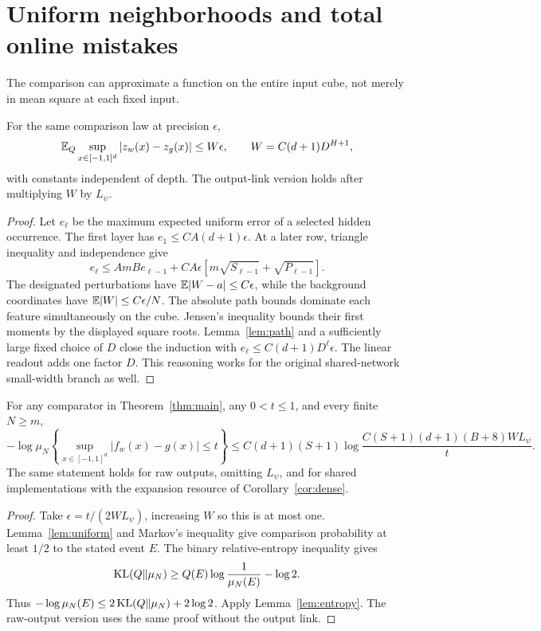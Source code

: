 \section{Uniform neighborhoods and total online mistakes}
The comparison can approximate a function on the entire input cube, not merely in mean square at each fixed input.

\begin{lemma}\label{lem:uniform}
For the same comparison law at precision $\epsilon$,
\[
 \mathbb E_Q\sup_{x\in[-1,1]^d}|z_w(x)-z_g(x)|
 \le W\epsilon,\qquad W=C(d+1)D^{H+1},
\]
with constants independent of depth. The output-link version holds after multiplying $W$ by $L_\psi$.
\end{lemma}
\begin{proof}
Let $e_\ell$ be the maximum expected uniform error of a selected hidden occurrence. The first layer has $e_1\le CA(d+1)\epsilon$. At a later row, triangle inequality and independence give
\[
 e_\ell\le AmB e_{\ell-1}
 +CA\epsilon\left[m\sqrt{S_{\ell-1}}+\sqrt{P_{\ell-1}}\right].
\]
The designated perturbations have $\mathbb E|W-a|\le C\epsilon$, while the background coordinates have $\mathbb E|W|\le C\epsilon/N$. The absolute path bounds dominate each feature simultaneously on the cube. Jensen's inequality bounds their first moments by the displayed square roots. Lemma~\ref{lem:path} and a sufficiently large fixed choice of $D$ close the induction with
$e_\ell\le C(d+1)D^\ell\epsilon$. The linear readout adds one factor $D$. This reasoning works for the original shared-network small-width branch as well.
\end{proof}

\begin{theorem}\label{thm:uniform-mass}
For any comparator in Theorem~\ref{thm:main}, any $0<t\le1$, and every finite $N\ge m$,
\begin{equation}
 -\log\mu_N\left\{
 \sup_{x\in[-1,1]^d}|f_w(x)-g(x)|\le t
 \right\}
 \le C(d+1)(S+1)
       \log\frac{C(S+1)(d+1)(B+8)W L_\psi}{t}.
 \label{eq:uniform-prior-mass}
\end{equation}
The same statement holds for raw outputs, omitting $L_\psi$, and for shared implementations with the expansion resource of Corollary~\ref{cor:dense}.
\end{theorem}
\begin{proof}
Take $\epsilon=t/(2WL_\psi)$, increasing $W$ so this is at most one.
Lemma~\ref{lem:uniform} and Markov's inequality give comparison probability at least $1/2$ to the stated event $E$. The binary relative-entropy inequality gives
\[
 \operatorname{KL}(Q\|\mu_N)\ge Q(E)\log\frac1{\mu_N(E)}-\log2.
\]
Thus $-\log\mu_N(E)\le2\operatorname{KL}(Q\|\mu_N)+2\log2$.
Apply Lemma~\ref{lem:entropy}. The raw-output version uses the same proof without the output link.
\end{proof}

